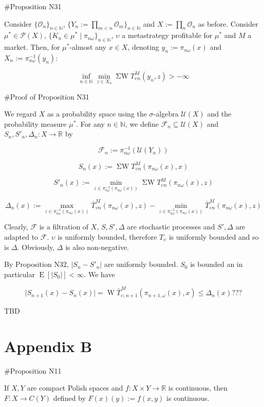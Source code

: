 \documentclass[a4paper]{article}
\DeclareMathOperator{\E}{E}
\newcommand{\Nats}{\mathbb{N}}
\newcommand{\Reals}{\mathbb{R}}
\newcommand{\Sq}[2]{\{#1\}_{#2 \in \Nats}}
\newcommand{\Sqn}[1]{\Sq{#1}{n}}
\newcommand{\Abs}[1]{\lvert #1 \rvert}
\newcommand{\Prob}{\mathcal{P}}
\newcommand{\Ob}{\mathcal{O}}
\newcommand{\UM}{\mathcal{U}}
\newcommand{\W}{\operatorname{W}}
\newcommand{\SW}{\operatorname{\Sigma W}}
\newcommand{\F}{\mathcal{F}}
\begin{document}
\#Proposition N31

Consider ${\Sqn{\Ob_n}}$, ${\Sqn{Y_n:=\prod_{m < n} \Ob_m}}$ and ${X:=\prod_n \Ob_n}$ as before. Consider ${\mu^* \in \Prob(X)}$, ${\{K_n \in \mu^* \mid \pi_{n\omega}\}_{n \in \Nats}}$, ${\upsilon}$ a metastrategy profitable for ${\mu^*}$ and ${M}$ a market. Then, for ${\mu^*}$-almost any ${x \in X}$, denoting ${y_n:=\pi_{n\omega}(x)}$ and ${X_n:=\pi_{n\omega}^{-1}(y_n)}$:

$$\inf_{n \in \Nats} \min_{z \in X_n} \SW T^M_{\upsilon n}(y_n,z) > -\infty$$

\#Proof of Proposition N31

We regard ${X}$ as a probability space using the ${\sigma}$-algebra ${\UM(X)}$ and the probability measure ${\mu^*}$. For any ${n \in \Nats}$, we define ${\F_n \subseteq \UM(X)}$ and ${S_n,S'_n,\Delta_n: X \rightarrow \Reals}$ by 

$${\F_n := \pi_{n\omega}^{-1}(\UM(Y_n))}$$

$$S_n(x):= \SW T^M_{\upsilon n}(\pi_{n\omega}(x),x)$$

$$S'_n(x):= \min_{z \in \pi_{n\omega}^{-1}(\pi_{n\omega}(x))} \SW T^M_{\upsilon n}(\pi_{n\omega}(x),z)$$

$$\Delta_n(x):=\max_{z \in \pi_{n\omega}^{-1}(\pi_{n\omega}(x))} \bar{T}^M_{\upsilon n}(\pi_{n\omega}(x),z) - \min_{z \in \pi_{n\omega}^{-1}(\pi_{n\omega}(x))} \bar{T}^M_{\upsilon n}(\pi_{n\omega}(x),z)$$

Clearly, ${\F}$ is a filtration of ${X}$, ${S,S',\Delta}$ are stochastic processes and ${S',\Delta}$ are adapted to ${\F}$. ${\upsilon}$ is uniformly bounded, therefore ${T_\upsilon}$  is uniformly bounded and so is ${\Delta}$. Obviously, ${\Delta}$ is also non-negative.

By Proposition N32, ${\Abs{S_n-S'_n}}$ are uniformly bounded. ${S_0}$ is bounded an in particular ${\E[\Abs{S_0}] < \infty}$. We have

$$\Abs{S_{n+1}(x)-S_n(x)} = \W \bar{T}_{\upsilon,n+1}^M(\pi_{n+1,\omega}(x),x) \leq \Delta_n(x)???$$

TBD

\section{Appendix B}

\#Proposition N11

If ${X,Y}$ are compact Polish spaces and ${f: X \times Y \rightarrow \Reals}$ is continuous, then ${F: X \rightarrow C(Y)}$ defined by ${F(x)(y):=f(x,y)}$ is continuous.
\end{document}
